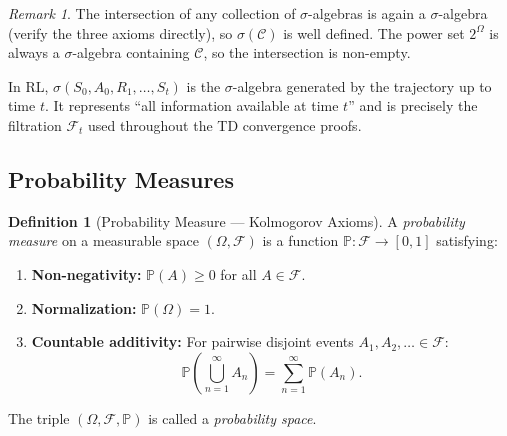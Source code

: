 \documentclass[11pt,a4paper]{article}
\theoremstyle{definition}
\newtheorem{definition}{Definition}[section]
\theoremstyle{plain}
\theoremstyle{remark}
\newtheorem{remark}{Remark}[section]
\newcommand{\Prob}{\mathbb{P}}
\begin{document}
\begin{remark}
The intersection of any collection of $\sigma$-algebras is again a $\sigma$-algebra (verify the three axioms directly), so $\sigma(\mathcal{C})$ is well defined. The power set $2^\Omega$ is always a $\sigma$-algebra containing $\mathcal{C}$, so the intersection is non-empty.
\end{remark}

\begin{rlconnection}[Connection to RL]
In RL, $\sigma(S_0, A_0, R_1, \ldots, S_t)$ is the $\sigma$-algebra generated by the trajectory up to time $t$. It represents ``all information available at time $t$'' and is precisely the filtration $\mathcal{F}_t$ used throughout the TD convergence proofs.
\end{rlconnection}

\subsection{Probability Measures}
\label{subsec:prob_measures}

\begin{definition}[Probability Measure --- Kolmogorov Axioms]
\label{def:prob_measure}
A \emph{probability measure} on a measurable space $(\Omega, \mathcal{F})$ is a function $\Prob: \mathcal{F} \to [0,1]$ satisfying:
\begin{enumerate}[nosep]
    \item \textbf{Non-negativity:} $\Prob(A) \geq 0$ for all $A \in \mathcal{F}$.
    \item \textbf{Normalization:} $\Prob(\Omega) = 1$.
    \item \textbf{Countable additivity:} For pairwise disjoint events $A_1, A_2, \ldots \in \mathcal{F}$:
    \begin{equation}
        \Prob\!\left(\bigcup_{n=1}^\infty A_n\right) = \sum_{n=1}^\infty \Prob(A_n).
        \label{eq:countable_additivity}
    \end{equation}
\end{enumerate}
The triple $(\Omega, \mathcal{F}, \Prob)$ is called a \emph{probability space}.
\end{definition}
\end{document}

